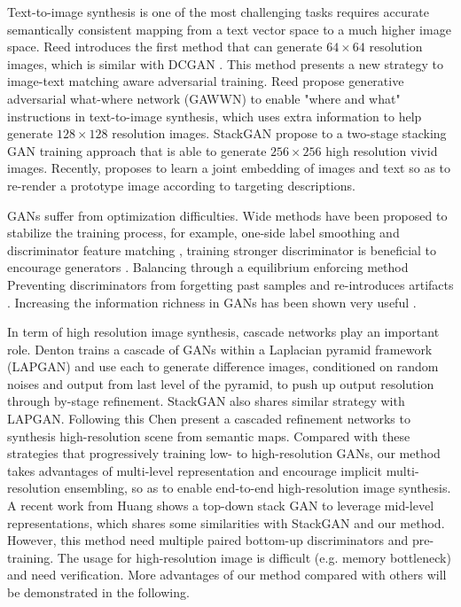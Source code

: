 \documentclass[10pt,twocolumn,letterpaper]{article}
\begin{document}
Text-to-image synthesis is one of the most challenging tasks requires accurate semantically consistent mapping from a text vector space to a much higher image space.  Reed \etal \cite{reed2016generative} introduces the first method that can generate $64{\times}64$ resolution images, which is similar with DCGAN \cite{}. This method presents a new strategy to image-text matching aware adversarial training. Reed \etal \cite{reed2016learning} propose  generative
adversarial what-where network (GAWWN) to enable "where and what" instructions in text-to-image synthesis, which uses extra information to help generate $128{\times}128$ resolution images. StackGAN \etal \cite{han2017stackgan} propose to a two-stage stacking GAN training approach that is able to generate $256{\times}256$ high resolution vivid images. Recently, \cite{dong2017semantic} proposes to learn a joint embedding of images and text so as to re-render a prototype image according to targeting descriptions. 	
	
GANs suffer from optimization difficulties. Wide methods have been proposed to stabilize the training process, for example, one-side label smoothing and discriminator feature matching \cite{salimans2016improved}, training stronger discriminator is beneficial to encourage generators \cite{arjovsky2017wasserstein}. Balancing through a equilibrium enforcing method \cite{berthelot2017began}
Preventing discriminators from forgetting past samples and re-introduces artifacts \cite{shrivastava2016learning}. Increasing the information richness in GANs has been shown very useful \cite{odena2016conditional}. 

In term of high resolution image synthesis, cascade networks play an important role.
Denton \etal \cite{denton2015deep} trains a cascade of GANs within a Laplacian pyramid framework (LAPGAN) and use each to generate difference images, conditioned on random noises and output from last level of the pyramid, to push up output resolution through by-stage refinement. StackGAN also shares similar strategy with LAPGAN. Following this Chen \etal \cite{chen2017photographic} present a cascaded refinement networks to synthesis high-resolution scene from semantic maps. Compared with these strategies that progressively training low- to high-resolution GANs, our method takes advantages of multi-level representation and encourage implicit multi-resolution ensembling, so as to enable end-to-end high-resolution image synthesis.
A recent work from Huang \etal \cite{huang2016stacked}
shows a top-down stack GAN to leverage mid-level representations, which shares some similarities with StackGAN and our method. However, this method need multiple paired  bottom-up discriminators and pre-training. The usage for high-resolution image is difficult (e.g. memory bottleneck) and need verification. More advantages of our method compared with others will be demonstrated in the following.
\end{document}
